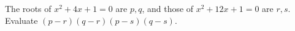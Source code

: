 The roots of $x^2+4x+1=0$ are $p,q$, and those of $x^2+12x+1=0$ are $r,s$. Evaluate $(p-r)(q-r)(p-s)(q-s)$.
